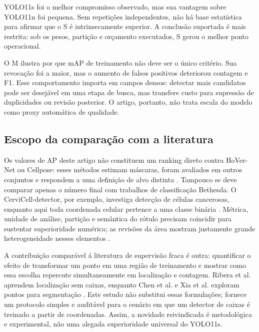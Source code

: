 YOLO11s foi o melhor compromisso observado, mas sua vantagem sobre YOLO11n foi
pequena. Sem repeti\c{c}\~oes independentes, n\~ao h\'a base estat\'istica para
afirmar que o S \'e intrinsecamente superior. A conclus\~ao suportada \'e mais
restrita: sob os pesos, parti\c{c}\~ao e or\c{c}amento executados, S gerou o melhor
ponto operacional.

O M ilustra por que mAP de treinamento n\~ao deve ser o \'unico crit\'erio. Sua
revoca\c{c}\~ao foi a maior, mas o aumento de falsos positivos deteriorou contagem
e F1. Esse comportamento importa em campos densos: detectar mais candidatos
pode ser desej\'avel em uma etapa de busca, mas transfere custo para supress\~ao
de duplicidades ou revis\~ao posterior. O artigo, portanto, n\~ao trata escala do
modelo como proxy autom\'atica de qualidade.

\subsection{Escopo da compara\c{c}\~ao com a literatura}

Os valores de AP deste artigo n\~ao constituem um ranking direto contra HoVer-Net
ou Cellpose: esses m\'etodos estimam m\'ascaras, foram avaliados em outros
conjuntos e respondem a uma defini\c{c}\~ao de alvo distinta
\cite{graham2019hovernet,stringer2021cellpose}. Tampouco se deve comparar apenas
o n\'umero final com trabalhos de classifica\c{c}\~ao Bethesda. O
CerviCell-detector, por exemplo, investiga detec\c{c}\~ao de c\'elulas cancerosas,
enquanto aqui toda coordenada celular pertence a uma classe bin\'aria
\cite{kalbhor2023cervicell}. M\'etrica, unidade de an\'alise, parti\c{c}\~ao e
sem\^antica do r\'otulo precisam coincidir para sustentar superioridade num\'erica;
as revis\~oes da \'area mostram justamente grande heterogeneidade nesses elementos
\cite{jiang2023systematic,fang2024systematic}.

A contribui\c{c}\~ao compar\'avel \'a literatura de supervis\~ao fraca \'e outra:
quantificar o efeito de transformar um ponto em uma regi\~ao de treinamento e
mostrar como essa escolha repercute simultaneamente em localiza\c{c}\~ao e
contagem. Ribera et al. aprendem localiza\c{c}\~ao sem caixas, enquanto Chen et
al. e Xia et al. exploram pontos para segmenta\c{c}\~ao
\cite{ribera2019locating,chen2021sparsepoints,xia2023colorization}. Este estudo
n\~ao substitui essas formula\c{c}\~oes; fornece um protocolo simples e audit\'avel
para o cen\'ario em que um detector de caixas \'e treinado a partir de coordenadas.
Assim, a novidade reivindicada \'e metodol\'ogica e experimental, n\~ao uma alegada
superioridade universal do YOLO11s.

